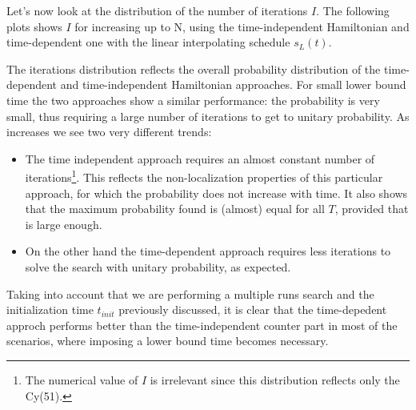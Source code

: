         \noindent
        Let's now look at the distribution of the number of iterations $I$. The following plots shows $I$ for increasing \tmin up to N, using the time-independent Hamiltonian and time-dependent one with the linear interpolating schedule $s_L(t)$.

        

        The iterations distribution reflects the overall probability distribution of the time-dependent and time-independent Hamiltonian approaches. For small lower bound time the two approaches show a similar performance: the probability is very small, thus requiring a large number of iterations to get to unitary probability. As \tmin increases we see two very different trends:
        \begin{itemize}
            \item The time independent approach requires an almost constant number of iterations\footnote{The numerical value of $I$ is irrelevant since this distribution reflects only the Cy(51).}. This reflects the non-localization properties of this particular approach, for which the probability does not increase with time. It also shows that the maximum probability found is (almost) equal for all $T$, provided that \tmin is large enough.
            \item On the other hand the time-dependent approach requires less iterations to solve the search with unitary probability, as expected.
        \end{itemize}
        Taking into account that we are performing a multiple runs search and the initialization time $t_{init}$ previously discussed, it is clear that the time-depedent approch performs better than the time-independent counter part in most of the scenarios, where imposing a lower bound time \tmin becomes necessary.

